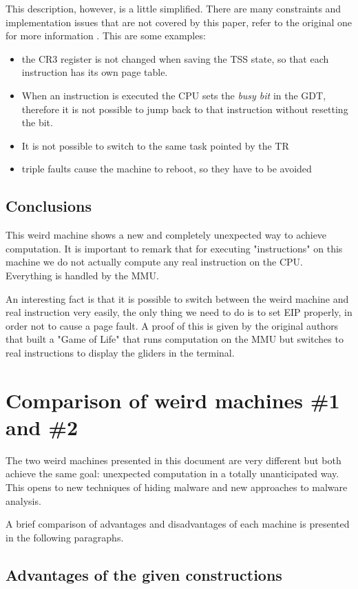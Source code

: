 \documentclass[11pt,twoside,a4paper]{article}
\begin{document}
This description, however, is a little simplified. There are many constraints and implementation issues that are not covered by this paper, refer to the original one for more information \cite{mmu_machine}. This are some examples:
\begin{itemize}
\item the CR3 register is not changed when saving the TSS state, so that each instruction has its own page table.
\item When an instruction is executed the CPU sets the \emph{busy bit} in the GDT, therefore it is not possible to jump back to that instruction without resetting the bit.
\item It is not possible to switch to the same task pointed by the TR
\item triple faults cause the machine to reboot, so they have to be avoided
\end{itemize}


\subsection{Conclusions}
This weird machine shows a new and completely unexpected way to achieve computation.
It is important to remark that for executing "instructions" on this machine we do not actually compute any real instruction on the CPU. Everything is handled by the MMU. 

An interesting fact is that it is possible to switch between the weird machine and real instruction very easily, the only thing we need to do is to set EIP properly, in order not to cause a page fault. A proof of this is given by the original authors that built a "Game of Life" that runs computation on the MMU but switches to real instructions to display the gliders in the terminal.


\section{Comparison of weird machines \#1 and \#2}

The two weird machines presented in this document are very different but both achieve the same goal: unexpected computation in a totally unanticipated way. This opens to new techniques of hiding malware and new approaches to malware analysis.

A brief comparison of advantages and disadvantages of each machine is presented in the following paragraphs.

\subsection{Advantages of the given constructions}
\end{document}
